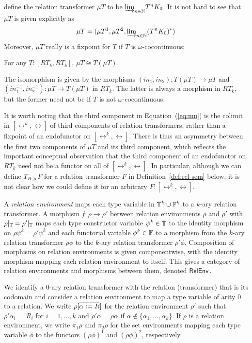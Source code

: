 \documentclass{lmcs}
\theoremstyle{plain}\newtheorem{satz}[thm]{Satz}
\begin{document}
{define the relation transformer $\mu T$ to be ${{\underrightarrow{\lim}}_{n \in \mathbb{N}}{T^n
  K_0}}$. It is not hard to see that $\mu T$ is given explicitly as
\begin{equation}\label{eq:mu}
\mu T = (\mu T^1,\mu T^2, {{\underrightarrow{\lim}}_{n \in \mathbb{N}}{(T^nK_0)^*}})
\end{equation}
Moreover, $\mu T$ really is a fixpoint for $T$ if $T$ is
$\omega$-cocontinuous:
\begin{lem}\label{lem:fp}
For any $T : [RT_k,RT_k]$, $\mu T \cong T(\mu T)$.
\end{lem}
\noindent
The isomorphism is given by the morphisms $(\mathit{in}_1,
\mathit{in}_2) : T(\mu T) \to \mu T$ and $(in_1^{-1}, in_2^{-1}) : \mu
T \to T(\mu T)$ in $RT_k$. The latter is always a morphism in $RT_k$,
but the former need not be if $T$ is not $\omega$-cocontinuous.

It is worth noting that the third component in Equation~(\ref{eq:mu})
is the colimit in $[\rel^k,\rel]$ of third components of relation
transformers, rather than a fixpoint of an endofunctor on
$[\rel^k,\rel]$. There is thus an asymmetry between the first two
components of $\mu T$ and its third component, which reflects the
important conceptual observation that the third component of an
endofunctor on $RT_k$ need not be a functor on all of
$[\rel^k,\rel]$. In particular, although we can define $T_{H,\rho}\,
F$ for a relation transformer $F$ in Definition~\ref{def:rel-sem}
below, it is not clear how we could define it for an arbitrary $F :
[\rel^k,\rel]$. 

\begin{defi}\label{def:reln-env}
A {\em relation environment} maps each type variable in $\mathbb{T}^k \cup
\mathbb{F}^k$ to a $k$-ary relation transformer.  A morphism $f : \rho \to
\rho'$ between relation environments $\rho$ and $\rho'$ with
$\rho|_{\mathbb{T}} = \rho'|_{\mathbb{T}}$ maps each type constructor variable
$\psi^k \in \mathbb{T}$ to the identity morphism on $\rho \psi^k = \rho'
\psi^k$ and each functorial variable $\phi^k \in \mathbb{F}$ to a morphism
from the $k$-ary relation transformer $\rho \phi$ to the $k$-ary
relation transformer $\rho' \phi$. Composition of morphisms on
relation environments is given componentwise, with the identity
morphism mapping each relation environment to itself. This gives a
category of relation environments and morphisms between them, denoted
$\mathsf{RelEnv}$.
\end{defi}
We identify a $0$-ary relation transformer with the relation
(transformer) that is its codomain and consider a relation environment
to map a type variable of arity $0$ to a relation.  We write
$\rho[\overline{\alpha := R}]$ for the relation environment $\rho'$ such
that $\rho' \alpha_i \, = R_i$ for $i = 1,...,k$ and $\rho' \alpha =
\rho\alpha$ if $\alpha \not \in \{\alpha_1,...,\alpha_k\}$.  If $\rho$
is a relation environment, we write $\pi_1 \rho$ and $\pi_2 \rho$ for
the set environments mapping each type variable $\phi$ to the functors
$(\rho\phi)^1$ and $(\rho\phi)^2$, respectively.

}
\end{document}
